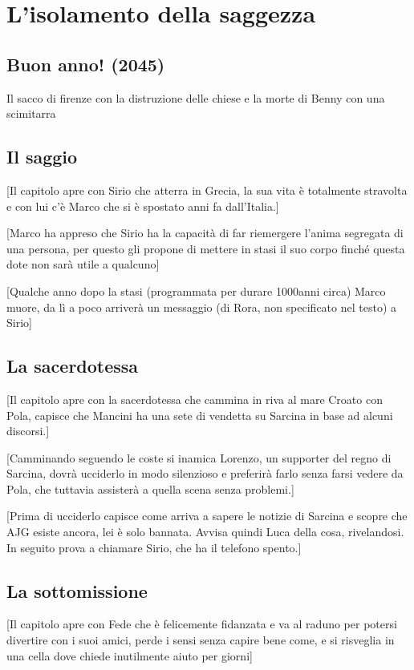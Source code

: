 
\chapter{L'isolamento della saggezza}
\section{Buon anno! (2045)}
Il sacco di firenze con la distruzione delle chiese e la morte di Benny con una scimitarra
\section{Il saggio}
[Il capitolo apre con Sirio che atterra in Grecia, la sua vita è totalmente stravolta e con lui c'è Marco che si è spostato anni fa dall'Italia.]

[Marco ha appreso che Sirio ha la capacità di far riemergere l'anima segregata di una persona, per questo gli propone di mettere in stasi il suo corpo finché questa dote non sarà utile a qualcuno]

[Qualche anno dopo la stasi (programmata per durare 1000anni circa) Marco muore, da lì a poco arriverà un messaggio (di Rora, non specificato nel testo) a Sirio]

\section{La sacerdotessa}
[Il capitolo apre con la sacerdotessa che cammina in riva al mare Croato con Pola, capisce che Mancini ha una sete di vendetta su Sarcina in base ad alcuni discorsi.]

[Camminando seguendo le coste si inamica Lorenzo, un supporter del regno di Sarcina, dovrà ucciderlo in modo silenzioso e preferirà farlo senza farsi vedere da Pola, che tuttavia assisterà a quella scena senza problemi.]

[Prima di ucciderlo capisce come arriva a sapere le notizie di Sarcina e scopre che AJG esiste ancora, lei è solo bannata. Avvisa quindi Luca della cosa, rivelandosi. In seguito prova a chiamare Sirio, che ha il telefono spento.]


\section{La sottomissione}

[Il capitolo apre con Fede che è felicemente fidanzata e va al raduno per potersi divertire con i suoi amici, perde i sensi senza capire bene come, e si risveglia in una cella dove chiede inutilmente aiuto per giorni]


